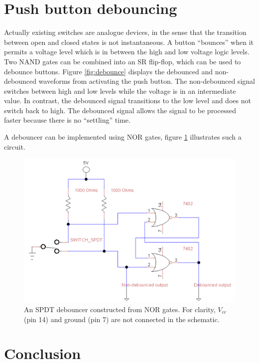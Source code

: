 \documentclass[11pt]{article}
\begin{document}
\section{Push button debouncing}

Actually existing switches are analogue devices, in the sense that the transition between open and closed states is not instantaneous. A button ``bounces'' when it permits a voltage level which is in between the high and low voltage logic levels. Two NAND gates can be combined into an SR flip-flop, which can be used to debounce buttons. Figure \ref{fig:debounce} displays the debounced and non-debounced waveforms from activating the push button. The non-debounced signal switches between high and low levels while the voltage is in an intermediate value. In contrast, the debounced signal transitions to the low level and does not switch back to high. The debounced signal allows the signal to be processed faster because there is no ``settling'' time.

A debouncer can be implemented using NOR gates, figure \ref{fig:nor_gates} illustrates such a circuit. 

\begin{figure}[h]
	\centering
	\includegraphics[scale=0.5, draft=false]{nor_gates}
	\caption{An SPDT debouncer constructed from NOR gates. For clarity, $V_{cc}$ (pin 14) and ground (pin 7) are not connected in the schematic.}
	\label{fig:nor_gates}
\end{figure}

\section{Conclusion}
\end{document}
